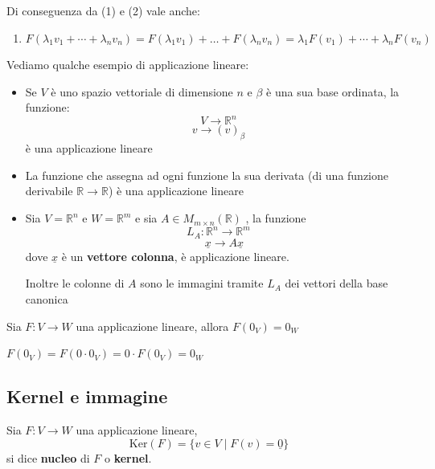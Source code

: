 \documentclass[
  a4paper,
]{article}
\providecommand{\tightlist}{%
  \setlength{\itemsep}{0pt}\setlength{\parskip}{0pt}}
\providecommand{\tightlist}{}
\begin{document}
\begin{observationbox}
Di conseguenza da (1) e (2) vale anche:

\begin{enumerate}
\def\labelenumi{\arabic{enumi}.}
\setcounter{enumi}{2}
\tightlist
\item
  \(F(\lambda_1 v_1 + \cdots + \lambda_n v_n) = F(\lambda_1 v_1) + \dots + F(\lambda_n v_n) = \lambda_1 F(v_1) + \cdots + \lambda_n F(v_n)\)
\end{enumerate}
\end{observationbox}

Vediamo qualche esempio di applicazione lineare:

\begin{itemize}
\item
  Se \(V\) è uno spazio vettoriale di dimensione \(n\) e \(\beta\) è una
  sua base ordinata, la funzione: \[
  V \to \mathbb{R}^n
  \] \[
  v \to (v)_{\beta}
  \] è una applicazione lineare
\item
  La funzione che assegna ad ogni funzione la sua derivata (di una
  funzione derivabile \(\mathbb{R} \to \mathbb{R}\)) è una applicazione
  lineare
\item
  Sia \(V = \mathbb{R}^n\) e \(W = \mathbb{R}^m\) e sia
  \(A \in M_{m\times n}(\mathbb{R})\) , la funzione \[
  L_A : \mathbb{R}^n \to \mathbb{R}^m
  \] \[
  \quad\underline{x} \to A\underline{x}
  \] dove \(\underline{x}\) è un \textbf{vettore colonna}, è
  applicazione lineare.

  Inoltre le colonne di \(A\) sono le immagini tramite \(L_A\) dei
  vettori della base canonica
\end{itemize}

\begin{propositionbox}
Sia \(F: V \to W\) una applicazione lineare, allora \(F(0_V) = 0_W\)
\end{propositionbox}

\begin{proofbox}
\(F(0_V) = F(0 \cdot 0_V) = 0 \cdot F(0_V) = 0_W\)
\end{proofbox}

\hypertarget{kernel-e-immagine}{%
\subsection{Kernel e immagine}\label{kernel-e-immagine}}

\begin{definitionbox}
Sia \(F: V \to W\) una applicazione lineare, \[
\text{Ker}(F) = \{v \in V \mid F(v) = \underline{0}\}
\] si dice \textbf{nucleo} di \(F\) o \textbf{kernel}.
\end{definitionbox}
\end{document}

